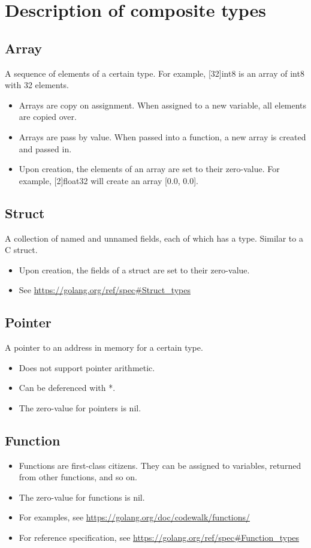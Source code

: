 \documentclass{article}
\begin{document}
\section{Description of composite types}
	\subsection{Array}
		A sequence of elements of a certain type. For example, \colorbox{code}{[32]int8} is an array of int8 with 32 elements. 
		\begin{itemize}
			\item Arrays are copy on assignment. When assigned to a new variable, all elements are copied over.
			\item Arrays are pass by value. When passed into a function, a new array is created and passed in. 
			\item Upon creation, the elements of an array are set to their zero-value. For example, \colorbox{code}{[2]float32} will create an array \colorbox{code}{[0.0, 0.0]}.
		\end{itemize}
		
	\subsection{Struct}
		A collection of named and unnamed fields, each of which has a type. Similar to a C struct.
		\begin{itemize}
			\item Upon creation, the fields of a struct are set to their zero-value. 
			\item See \url{https://golang.org/ref/spec#Struct_types}
		\end{itemize}
		
	\subsection{Pointer}
		A pointer to an address in memory for a certain type. 
		\begin{itemize}
			\item Does not support pointer arithmetic. 
			\item Can be deferenced with \colorbox{code}{*}.
			\item The zero-value for pointers is \colorbox{code}{nil}. 
		\end{itemize}
		
	\subsection{Function}	
		\begin{itemize}
			\item Functions are first-class citizens. They can be assigned to variables, returned from other functions, and so on.
			\item The zero-value for functions is \colorbox{code}{nil}.
			\item For examples, see \url{https://golang.org/doc/codewalk/functions/}
			\item For reference specification, see \url{https://golang.org/ref/spec#Function_types}
		\end{itemize}
		
\end{document}
